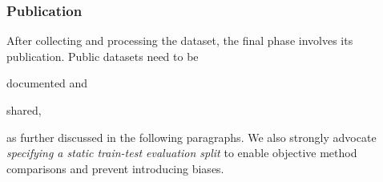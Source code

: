 \subsubsection{Publication}
\label{sssec:recommendations_creation_publication}

After collecting and processing the dataset, the final phase involves its publication. Public datasets need to be
\begin{enumerate*}[label=\alph*)]
    \item documented and
    \item shared,
\end{enumerate*}
as further discussed in the following paragraphs. We also strongly advocate \emph{specifying a static train-test evaluation split} to enable objective method comparisons and prevent introducing biases.

